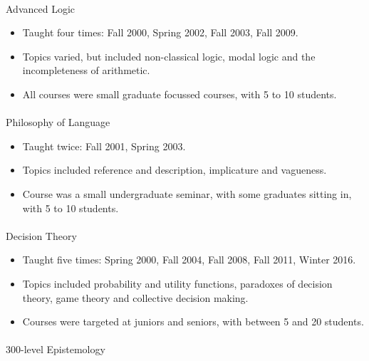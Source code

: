 \documentclass[
  10pt,
  letterpaper,
  DIV=11,
  numbers=noendperiod,
  twoside]{scrartcl}
\makeatletter
\let\oldparagraph\paragraph
\renewcommand{\paragraph}{
    \@ifstar
      \xxxParagraphStar
      \xxxParagraphNoStar
  }
\newcommand{\xxxParagraphStar}[1]{\oldparagraph*{#1}\mbox{}}
\newcommand{\xxxParagraphNoStar}[1]{\oldparagraph{#1}\mbox{}}
\providecommand{\tightlist}{%
  \setlength{\itemsep}{0pt}\setlength{\parskip}{0pt}}
\makeatother
\begin{document}
\paragraph{Advanced Logic}\label{advanced-logic}

\begin{itemize}
\tightlist
\item
  Taught four times: Fall 2000, Spring 2002, Fall 2003, Fall 2009.
\item
  Topics varied, but included non-classical logic, modal logic and the
  incompleteness of arithmetic.
\item
  All courses were small graduate focussed courses, with 5 to 10
  students.
\end{itemize}

\paragraph{Philosophy of Language}\label{philosophy-of-language}

\begin{itemize}
\tightlist
\item
  Taught twice: Fall 2001, Spring 2003.
\item
  Topics included reference and description, implicature and vagueness.
\item
  Course was a small undergraduate seminar, with some graduates sitting
  in, with 5 to 10 students.
\end{itemize}

\paragraph{Decision Theory}\label{decision-theory}

\begin{itemize}
\tightlist
\item
  Taught five times: Spring 2000, Fall 2004, Fall 2008, Fall 2011,
  Winter 2016.
\item
  Topics included probability and utility functions, paradoxes of
  decision theory, game theory and collective decision making.
\item
  Courses were targeted at juniors and seniors, with between 5 and 20
  students.
\end{itemize}

\paragraph{300-level Epistemology}\label{level-epistemology}
\end{document}
